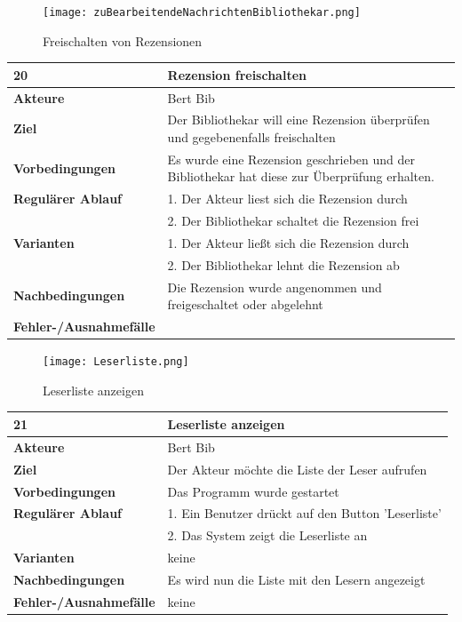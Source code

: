 \documentclass[fontsize=12pt,paper=a4,twoside]{scrartcl}
\begin{document}
\begin{figure}
	[H] \caption{Freischalten von Rezensionen} 
	\texttt{[image: zuBearbeitendeNachrichtenBibliothekar.png]} \label{pic:RezensionenFreischalten} 
\end{figure}
\begin{table}
	[H] \label{20} 
	\begin{tabular}
		{|l|p{10cm}|} \hline \textbf{20} & \textbf{Rezension freischalten} \\
		\hline \textbf{Akteure} & Bert Bib\\
		\hline \textbf{Ziel} & Der Bibliothekar will eine Rezension überprüfen und gegebenenfalls freischalten \\
		\hline \textbf{Vorbedingungen} & Es wurde eine Rezension geschrieben und der Bibliothekar hat diese zur Überprüfung erhalten. \\
		\hline \textbf{Regulärer Ablauf} & 1. Der Akteur liest sich die Rezension durch \\
		&2. Der Bibliothekar schaltet die Rezension frei\\
		\hline \textbf{Varianten} & 1. Der Akteur ließt sich die Rezension durch \\
		&2. Der Bibliothekar lehnt die Rezension ab \\
		\hline \textbf{Nachbedingungen} & Die Rezension wurde angenommen und freigeschaltet oder abgelehnt\\
		\hline \textbf{Fehler-/Ausnahmefälle} & \\
		\hline 
	\end{tabular}
\end{table}
\begin{figure}
	[H] \caption{Leserliste anzeigen} 
	\texttt{[image: Leserliste.png]} \label{pic:Leserliste} 
\end{figure}
\begin{table}
	[H] \label{21} 
	\begin{tabular}
		{|l|p{10cm}|} \hline \textbf{21} & \textbf{Leserliste anzeigen} \\
		\hline \textbf{Akteure} & Bert Bib\\
		\hline \textbf{Ziel} & Der Akteur möchte die Liste der Leser aufrufen \\
		\hline \textbf{Vorbedingungen} & Das Programm wurde gestartet \\
		\hline \textbf{Regulärer Ablauf} & 1. Ein Benutzer drückt auf den Button 'Leserliste' \\
		&2. Das System zeigt die Leserliste an\\
		\hline \textbf{Varianten} & keine \\
		\hline \textbf{Nachbedingungen} & Es wird nun die Liste mit den Lesern angezeigt \\
		\hline \textbf{Fehler-/Ausnahmefälle} & keine\\
		\hline 
	\end{tabular}
\end{table}
\end{document}
